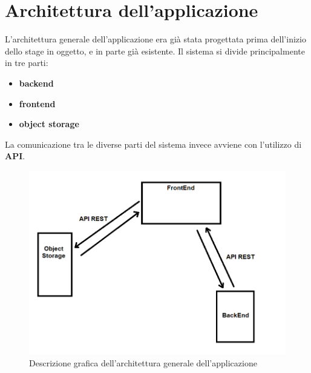 \section{Architettura dell'applicazione}
L'architettura generale dell'applicazione era già stata progettata prima dell'inizio dello stage in oggetto, e in parte già esistente. Il sistema si divide principalmente in tre parti:
\begin{itemize}
  \item \textbf{backend}
  \item \textbf{frontend}
  \item \textbf{object storage}
\end{itemize}

La comunicazione tra le diverse parti del sistema invece avviene con l'utilizzo di \textbf{\gls{API}\glsfirstoccur}.

\begin{figure}[H]
  \centering
  \includegraphics[width=\textwidth]{immagini/architettura-generale.png}
  \caption{Descrizione grafica dell'architettura generale dell'applicazione}
\end{figure}

